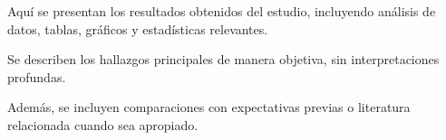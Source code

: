 \label{sec:resultados}

Aquí se presentan los resultados obtenidos del estudio, incluyendo análisis de datos, tablas, gráficos y estadísticas relevantes.

Se describen los hallazgos principales de manera objetiva, sin interpretaciones profundas.

Además, se incluyen comparaciones con expectativas previas o literatura relacionada cuando sea apropiado.